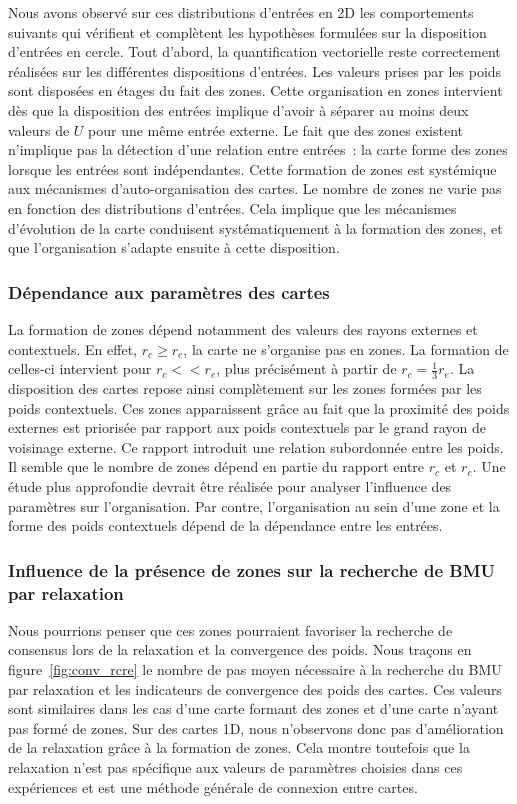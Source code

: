 \documentclass[../main]{subfiles}
\begin{document}
Nous avons observé sur ces distributions d'entrées en 2D les comportements suivants qui vérifient et complètent les hypothèses formulées sur la disposition d'entrées en cercle.
Tout d'abord, la quantification vectorielle reste correctement réalisées sur les différentes dispositions d'entrées. 
Les valeurs prises par les poids sont disposées en étages du fait des zones.
Cette organisation en zones intervient dès que la disposition des entrées implique d'avoir à séparer au moins deux valeurs de $U$ pour une même entrée externe.
Le fait que des zones existent n'implique pas la détection d'une relation entre entrées~: la carte forme des zones lorsque les entrées sont indépendantes. Cette formation de zones est systémique aux mécanismes d'auto-organisation des cartes. Le nombre de zones ne varie pas en fonction des distributions d'entrées. Cela implique que les mécanismes d'évolution de la carte conduisent systématiquement à la formation des zones, et que l'organisation s'adapte ensuite à cette disposition. 

\subsubsection{Dépendance aux paramètres des cartes}

La formation de zones dépend notamment des valeurs des rayons externes et contextuels. 
En effet, $r_c \geq r_e$, la carte ne s'organise pas en zones. La formation de celles-ci intervient pour $r_c << r_e$, plus précisément à partir de $r_c = \frac{1}{3} r_e$.
La disposition des cartes repose ainsi complètement sur les zones formées par les poids contextuels. 
Ces zones apparaissent grâce au fait que la proximité des poids externes est priorisée par rapport aux poids contextuels par le grand rayon de voisinage externe. Ce rapport introduit une relation subordonnée entre les poids. 
Il semble que le nombre de zones dépend en partie du rapport entre $r_c$ et $r_e$. Une étude plus approfondie devrait être réalisée pour analyser l'influence des paramètres sur l'organisation. Par contre, l'organisation au sein d'une zone et la forme des poids contextuels dépend de la dépendance entre les entrées. 

\subsubsection{Influence de la présence de zones sur la recherche de BMU par relaxation}

Nous pourrions penser que ces zones pourraient favoriser la recherche de consensus lors de la relaxation et la convergence des poids.
Nous traçons en figure~\ref{fig:conv_rcre} le nombre de pas moyen nécessaire à la recherche du BMU par relaxation et les indicateurs de convergence des poids des cartes.
Ces valeurs sont similaires dans les cas d'une carte formant des zones et d'une carte n'ayant pas formé de zones. Sur des cartes 1D, nous n'observons donc pas d'amélioration de la relaxation grâce à la formation de zones.
Cela montre toutefois que la relaxation n'est pas spécifique aux valeurs de paramètres choisies dans ces expériences et est une méthode générale de connexion entre cartes.
\end{document}
